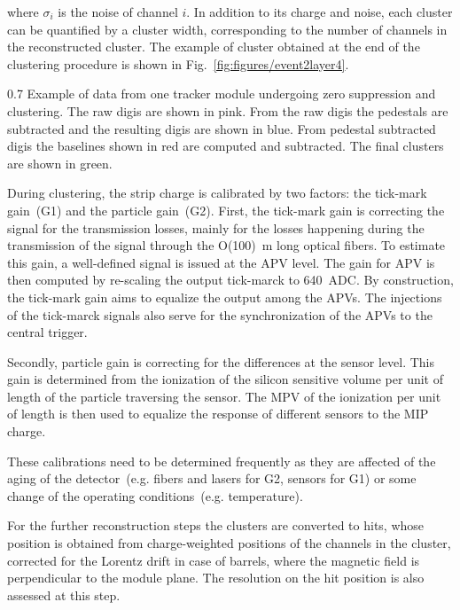 where $\sigma_{i}$ is the noise of channel $i$. In addition to its charge and noise, each cluster can be quantified by a cluster width, corresponding to the number of channels in the reconstructed cluster. The example of cluster obtained at the end of the clustering procedure is shown in Fig.~\ref{fig:figures/event2layer4}.

                 {0.7}       %
                 {Example of data from one tracker module undergoing zero suppression and clustering. The raw digis are shown in pink. From the raw digis the pedestals are subtracted and the resulting digis are shown in blue. From pedestal subtracted digis the baselines shown in red are computed and subtracted. The final clusters are shown in green.} %


During clustering, the strip charge is calibrated by two factors: the tick-mark gain~(G1) and the particle gain~(G2). First, the tick-mark gain is correcting the signal for the transmission losses, mainly for the losses happening during the transmission of the signal through the O(100)~m long optical fibers. To estimate this gain, a well-defined signal is issued at the APV level. The gain for APV is then computed by re-scaling the output tick-marck to 640~ADC. By construction, the tick-mark gain aims to equalize the output among the APVs. The injections of the tick-marck signals also serve for the synchronization of the APVs to the central trigger.

Secondly, particle gain is correcting for the differences at the sensor level. This gain is determined from the ionization of the silicon sensitive volume per unit of length of the particle traversing the sensor. The MPV of the ionization per unit of length is then used to equalize the response of different sensors to the MIP charge. 

These calibrations need to be determined frequently as they are affected of the aging of the detector~(e.g. fibers and lasers for G2,  sensors for G1) or some change of the operating conditions~(e.g. temperature).

For the further reconstruction steps the clusters are converted to hits, whose position is obtained from charge-weighted positions of the channels in the cluster, corrected for the Lorentz drift in case of barrels, where the magnetic field is perpendicular to the module plane. The resolution on the hit position is also assessed at this step.


